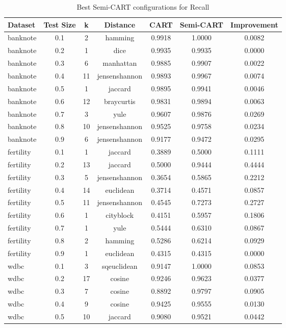 \begin{table}[ht]
\centering
\caption{Best Semi-CART configurations for Recall}
\begin{tabular}{lcccccc}
\hline
Dataset & Test Size & k & Distance & CART & Semi-CART & Improvement \\ \hline
banknote & 0.1 & 2 & hamming & 0.9918 & 1.0000 & 0.0082 \\
banknote & 0.2 & 1 & dice & 0.9935 & 0.9935 & 0.0000 \\
banknote & 0.3 & 6 & manhattan & 0.9885 & 0.9907 & 0.0022 \\
banknote & 0.4 & 11 & jensenshannon & 0.9893 & 0.9967 & 0.0074 \\
banknote & 0.5 & 1 & jaccard & 0.9895 & 0.9941 & 0.0046 \\
banknote & 0.6 & 12 & braycurtis & 0.9831 & 0.9894 & 0.0063 \\
banknote & 0.7 & 3 & yule & 0.9607 & 0.9876 & 0.0269 \\
banknote & 0.8 & 10 & jensenshannon & 0.9525 & 0.9758 & 0.0234 \\
banknote & 0.9 & 6 & jensenshannon & 0.9177 & 0.9472 & 0.0295 \\
fertility & 0.1 & 1 & jaccard & 0.3889 & 0.5000 & 0.1111 \\
fertility & 0.2 & 13 & jaccard & 0.5000 & 0.9444 & 0.4444 \\
fertility & 0.3 & 5 & jensenshannon & 0.3654 & 0.5865 & 0.2212 \\
fertility & 0.4 & 14 & euclidean & 0.3714 & 0.4571 & 0.0857 \\
fertility & 0.5 & 11 & jensenshannon & 0.4545 & 0.7273 & 0.2727 \\
fertility & 0.6 & 1 & cityblock & 0.4151 & 0.5957 & 0.1806 \\
fertility & 0.7 & 1 & yule & 0.5444 & 0.6310 & 0.0867 \\
fertility & 0.8 & 2 & hamming & 0.5286 & 0.6214 & 0.0929 \\
fertility & 0.9 & 1 & euclidean & 0.4315 & 0.4315 & 0.0000 \\
wdbc & 0.1 & 3 & sqeuclidean & 0.9147 & 1.0000 & 0.0853 \\
wdbc & 0.2 & 17 & cosine & 0.9246 & 0.9623 & 0.0377 \\
wdbc & 0.3 & 7 & cosine & 0.8892 & 0.9797 & 0.0905 \\
wdbc & 0.4 & 9 & cosine & 0.9425 & 0.9555 & 0.0130 \\
wdbc & 0.5 & 10 & jaccard & 0.9080 & 0.9521 & 0.0442 \\

\end{tabular}
\end{table}
